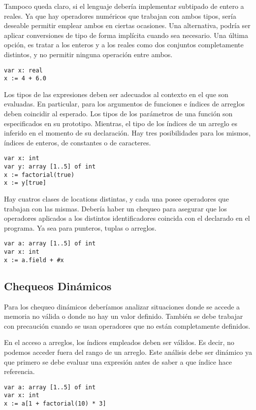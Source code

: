 \documentclass{article}
\begin{document}
Tampoco queda claro, si el lenguaje debería implementar subtipado de entero a reales.
Ya que hay operadores numéricos que trabajan con ambos tipos, sería deseable permitir emplear ambos en ciertas ocasiones.
Una alternativa, podría ser aplicar conversiones de tipo de forma implícita cuando sea necesario.
Una última opción, es tratar a los enteros y a los reales como dos conjuntos completamente distintos, y no permitir ninguna operación entre ambos.
\begin{lstlisting}
var x: real
x := 4 + 6.0
\end{lstlisting}

Los tipos de las expresiones deben ser adecuados al contexto en el que son evaluadas.
En particular, para los argumentos de funciones e índices de arreglos deben coincidir al esperado.
Los tipos de los parámetros de una función son especificados en su prototipo.
Mientras, el tipo de los índices de un arreglo es inferido en el momento de su declaración.
Hay tres posibilidades para los mismos, índices de enteros, de constantes o de caracteres.
\begin{lstlisting}
var x: int
var y: array [1..5] of int
x := factorial(true)
x := y[true]
\end{lstlisting}

Hay cuatros clases de locations distintas, y cada una posee operadores que trabajan con las mismas.
Debería haber un chequeo para asegurar que los operadores aplicados a los distintos identificadores coincida con el declarado en el programa.
Ya sea para punteros, tuplas o arreglos.
\begin{lstlisting}
var a: array [1..5] of int
var x: int
x := a.field + #x
\end{lstlisting}

\subsection{Chequeos Dinámicos}

Para los chequeo dinámicos deberíamos analizar situaciones donde se accede a memoria no válida o donde no hay un valor definido.
También se debe trabajar con precaución cuando se usan operadores que no están completamente definidos.

En el acceso a arreglos, los índices empleados deben ser válidos.
Es decir, no podemos acceder fuera del rango de un arreglo.
Este análisis debe ser dinámico ya que primero se debe evaluar una expresión antes de saber a que índice hace referencia.
\begin{lstlisting}
var a: array [1..5] of int
var x: int
x := a[1 + factorial(10) * 3]
\end{lstlisting}
\end{document}

